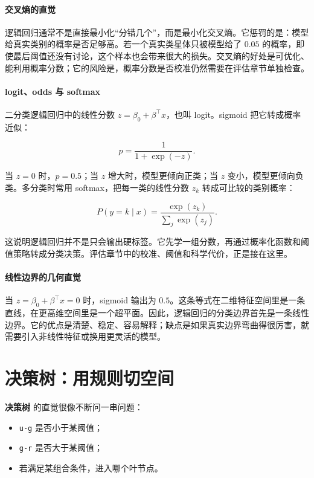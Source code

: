 \paragraph{交叉熵的直觉}

逻辑回归通常不是直接最小化“分错几个”，而是最小化交叉熵。它惩罚的是：模型给真实类别的概率是否足够高。若一个真实类星体只被模型给了 \(0.05\) 的概率，即使最后阈值还没有讨论，这个样本也会带来很大的损失。交叉熵的好处是可优化、能利用概率分数；它的风险是，概率分数是否校准仍然需要在评估章节单独检查。

\paragraph{logit、odds 与 softmax}

二分类逻辑回归中的线性分数 \(z=\beta_0+\beta^\top x\)，也叫 logit。sigmoid 把它转成概率近似：

\[
p=\frac{1}{1+\exp(-z)}.
\]

当 \(z=0\) 时，\(p=0.5\)；当 \(z\) 增大时，模型更倾向正类；当 \(z\) 变小，模型更倾向负类。多分类时常用 softmax，把每一类的线性分数 \(z_k\) 转成可比较的类别概率：

\[
P(y=k\mid x)=
\frac{\exp(z_k)}
{\sum_{j}\exp(z_j)}.
\]

这说明逻辑回归并不是只会输出硬标签。它先学一组分数，再通过概率化函数和阈值策略转成分类决策。评估章节中的校准、阈值和科学代价，正是接在这里。

\paragraph{线性边界的几何直觉}

当 $z=\beta_0+\beta^\top x=0$ 时，sigmoid 输出为 $0.5$。这条等式在二维特征空间里是一条直线，在更高维空间里是一个超平面。因此，逻辑回归的分类边界首先是一条线性边界。它的优点是清楚、稳定、容易解释；缺点是如果真实边界弯曲得很厉害，就需要引入非线性特征或换用更灵活的模型。

\section{决策树：用规则切空间}

\textbf{决策树} 的直觉很像不断问一串问题：

\begin{itemize}
    \item \texttt{u-g} 是否小于某阈值；
    \item \texttt{g-r} 是否大于某阈值；
    \item 若满足某组合条件，进入哪个叶节点。
\end{itemize}

